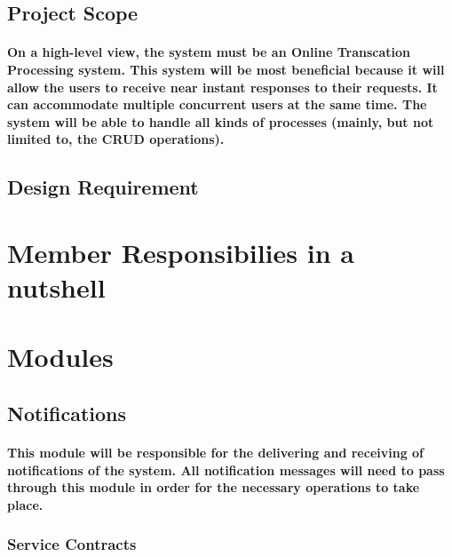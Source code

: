 \documentclass[12pt]{article}
\begin{document}
\paragraph{}

\subsection{Project Scope}
\paragraph{On a high-level view, the system must be an Online Transcation Processing system. This system will be most beneficial because it will allow the users to receive near instant responses to their requests. It can accommodate multiple concurrent users at the same time. The system will be able to handle all kinds of processes (mainly, but not limited to, the CRUD operations).}

\subsection{Design Requirement}
\paragraph{}

\section{Member Responsibilies in a nutshell}
\paragraph{}

\section{Modules}
\subsection{Notifications}
\paragraph{This module will be responsible for the delivering and receiving of notifications of the system. All notification messages will need to pass through this module in order for the necessary operations to take place.}
\subsubsection{Service Contracts}
\end{document}
